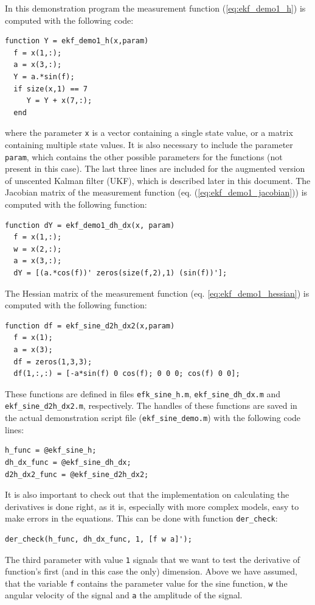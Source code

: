 In this demonstration program the measurement function
(\ref{eq:ekf_demo1_h}) is computed with the following code:
%
\begin{lstlisting} 
function Y = ekf_demo1_h(x,param) 
  f = x(1,:); 
  a = x(3,:); 
  Y = a.*sin(f); 
  if size(x,1) == 7 
     Y = Y + x(7,:); 
  end
\end{lstlisting}
%
where the parameter \texttt{x} is a vector containing a single state
value, or a matrix containing multiple state values. It is also
necessary to include the parameter \texttt{param}, which contains the
other possible parameters for the functions (not present in this
case). The last three lines are included for the augmented version of
unscented Kalman filter (UKF), which is described later in this
document.  The Jacobian matrix of the measurement function (eq.
(\ref{eq:ekf_demo1_jacobian})) is computed with the following
function:
%
\begin{lstlisting} 
function dY = ekf_demo1_dh_dx(x, param) 
  f = x(1,:); 
  w = x(2,:); 
  a = x(3,:); 
  dY = [(a.*cos(f))' zeros(size(f,2),1) (sin(f))'];
\end{lstlisting}
%
The Hessian matrix of the measurement function (eq.
\ref{eq:ekf_demo1_hessian}) is computed with the following function:
%
\begin{lstlisting} 
function df = ekf_sine_d2h_dx2(x,param) 
  f = x(1); 
  a = x(3);
  df = zeros(1,3,3); 
  df(1,:,:) = [-a*sin(f) 0 cos(f); 0 0 0; cos(f) 0 0];
\end{lstlisting}
% 
These functions are defined in files \texttt{efk\_sine\_h.m},
\texttt{ekf\_sine\_dh\_dx.m} and \texttt{ekf\_sine\_d2h\_dx2.m},
respectively. The handles of these functions are saved in the actual
demonstration script file (\texttt{ekf\_sine\_demo.m}) with the
following code lines:
%
\begin{lstlisting} 
h_func = @ekf_sine_h; 
dh_dx_func = @ekf_sine_dh_dx;
d2h_dx2_func = @ekf_sine_d2h_dx2;
\end{lstlisting}
%

It is also important to check out that the implementation on
calculating the derivatives is done right, as it is, especially with
more complex models, easy to make errors in the equations. This can be
done with function \texttt{der\_check}:
%
\begin{lstlisting} 
der_check(h_func, dh_dx_func, 1, [f w a]');
\end{lstlisting}
%
The third parameter with value \texttt{1} signals that we want to test
the derivative of function's first (and in this case the only)
dimension.  Above we have assumed, that the variable \texttt{f}
contains the parameter value for the sine function, \texttt{w} the
angular velocity of the signal and \texttt{a} the amplitude of the
signal.

